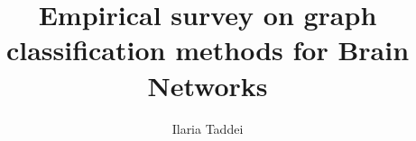 \documentclass[english, Lau, oneside]{sapthesis}%
\title{Empirical survey on graph classification methods for Brain Networks}
\author{Ilaria Taddei}
\begin{document}
	\frontmatter
	\maketitle
	
	\tableofcontents
	
	\mainmatter
	
	
	 
	
	
	\backmatter
	
	\printbibliography
	\clearpage
	
	
\end{document}
